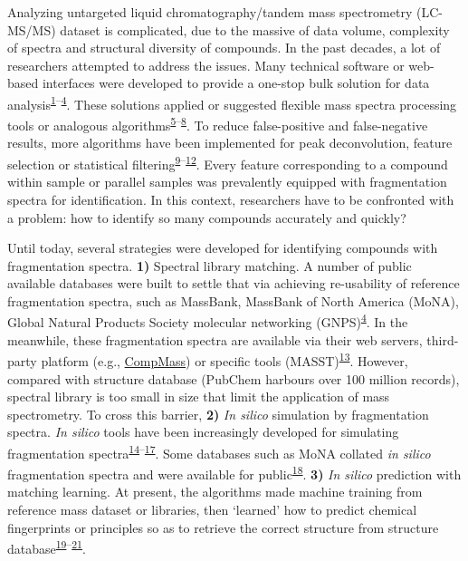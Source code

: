 \documentclass[
]{article}
\begin{document}
Analyzing untargeted liquid chromatography/tandem mass spectrometry
(LC-MS/MS) dataset is complicated, due to the massive of data volume,
complexity of spectra and structural diversity of compounds. In the past
decades, a lot of researchers attempted to address the issues. Many
technical software or web-based interfaces were developed to provide a
one-stop bulk solution for data
analysis\textsuperscript{\protect\hyperlink{ref-2020p}{1}--\protect\hyperlink{ref-2016a}{4}}.
These solutions applied or suggested flexible mass spectra processing
tools or analogous
algorithms\textsuperscript{\protect\hyperlink{ref-2012d}{5}--\protect\hyperlink{ref-2010}{8}}.
To reduce false-positive and false-negative results, more algorithms
have been implemented for peak deconvolution, feature selection or
statistical
filtering\textsuperscript{\protect\hyperlink{ref-2017f}{9}--\protect\hyperlink{ref-2022b}{12}}.
Every feature corresponding to a compound within sample or parallel
samples was prevalently equipped with fragmentation spectra for
identification. In this context, researchers have to be confronted with
a problem: how to identify so many compounds accurately and quickly?

Until today, several strategies were developed for identifying compounds
with fragmentation spectra. \textbf{1)} Spectral library matching. A
number of public available databases were built to settle that via
achieving re-usability of reference fragmentation spectra, such as
MassBank, MassBank of North America (MoNA), Global Natural Products
Society molecular networking
(GNPS)\textsuperscript{\protect\hyperlink{ref-2016a}{4}}. In the
meanwhile, these fragmentation spectra are available via their web
servers, third-party platform (e.g.,
\href{http://prime.psc.riken.jp/compms/msdial/main.html\#MSP\%3E}{CompMass})
or specific tools
(MASST)\textsuperscript{\protect\hyperlink{ref-2020cm}{13}}. However,
compared with structure database (PubChem harbours over 100 million
records), spectral library is too small in size that limit the
application of mass spectrometry. To cross this barrier, \textbf{2)}
\emph{In silico} simulation by fragmentation spectra. \emph{In silico}
tools have been increasingly developed for simulating fragmentation
spectra\textsuperscript{\protect\hyperlink{ref-2010c}{14}--\protect\hyperlink{ref-2017aq}{17}}.
Some databases such as MoNA collated \emph{in silico} fragmentation
spectra and were available for
public\textsuperscript{\protect\hyperlink{ref-2013w}{18}}. \textbf{3)}
\emph{In silico} prediction with matching learning. At present, the
algorithms made machine training from reference mass dataset or
libraries, then `learned' how to predict chemical fingerprints or
principles so as to retrieve the correct structure from structure
database\textsuperscript{\protect\hyperlink{ref-2012ab}{19}--\protect\hyperlink{ref-2018ay}{21}}.
\end{document}
